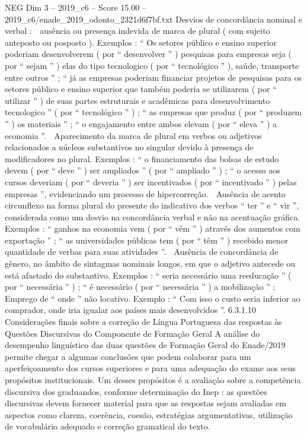 \begin{textsample}{NEG Dim 3 – 2019\_c6 – Score 15.00 – 2019\_c6/enade\_2019\_odonto\_2321d6f7bf.txt}
Desvios de concordância nominal e verbal :  ausência ou presença indevida de marca de plural ( com sujeito anteposto ou posposto ).
Exemplos : “ Os setores público e ensino superior poderiam desenvolverem ( por “ desenvolver ” ) pesquisas para empresas seja ( por “ sejam ” ) elas do tipo tecnologico ( por “ tecnológico ” ), saúde, transporte entre outros ” ; “ já as empresas poderiam financiar projetos de pesquisas para os setores público e ensino superior que também poderia se utilizarem ( por “ utilizar ” ) de suas partes estruturais e acadêmicas para desenvolvimento tecnologico ” ( por “ tecnológico ” ) ; “ as empresas que produz ( por “ produzem ” ) os materiais ” ; “ o engajamento entre ambos elevam ( por “ eleva ” ) a economia ”.  Aparecimento da marca de plural em verbos ou adjetivos relacionados a núcleos substantivos no singular devido à presença de modificadores no plural.
Exemplos : “ o financiamento das bolsas de estudo devem ( por “ deve ” ) ser ampliados ” ( por “ ampliado ” ) ; “ o acesso aos cursos deveriam ( por “ deveria ” ) ser incentivados ( por “ incentivado ” ) pelas empresas ”, evidenciando um processo de hipercorreção.  Ausência de acento circunflexo na forma plural do presente do indicativo dos verbos “ ter ” e “ vir ”, considerada como um desvio na concordância verbal e não na acentuação gráfica.
Exemplos : “ ganhos na economia vem ( por “ vêm ” ) através dos aumentos com exportação ” ; “ as universidades públicas tem ( por “ têm ” ) recebido menor quantidade de verbas para suas atividades ”.  Ausência de concordância de gênero, no âmbito de sintagmas nominais longos, em que o adjetivo antecede ou está afastado do substantivo.
Exemplos : “ seria necessário uma reeducação ” ( por “ necessária ” ) ; “ é necessário ( por “ necessária ” ) a mobilização ” ;  Emprego de “ onde ” não locativo.
Exemplo : “ Com isso o custo seria inferior ao comprador, onde iria igualar aos países mais desenvolvidos ”. 6.3.1.10 Considerações finais sobre a correção de Língua Portuguesa das respostas às Questões Discursivas do Componente de Formação Geral A análise do desempenho linguístico das duas questões de Formação Geral do Enade/2019 permite chegar a algumas conclusões que podem colaborar para um aperfeiçoamento dos cursos superiores e para uma adequação do exame aos seus propósitos institucionais.
Um desses propósitos é a avaliação sobre a competência discursiva dos graduandos, conforme determinação do Inep : as questões discursivas devem fornecer material para que as respostas sejam avaliadas em aspectos como clareza, coerência, coesão, estratégias argumentativas, utilização de vocabulário adequado e correção gramatical do texto.

\end{textsample}
